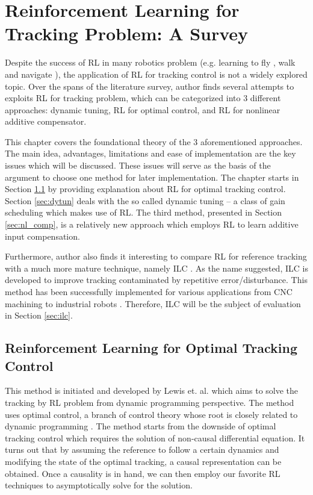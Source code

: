 %
\chapter{Reinforcement Learning for Tracking Problem: A Survey} \label{chap::survey}
Despite the success of \ac{RL} in many robotics problem (e.g. learning to fly \cite{Abbeel}, walk \cite{NIPS2007_3253} and navigate \cite{4543641}), the application of \ac{RL} for tracking control is not a widely explored topic. Over the spans of the literature survey, author finds several attempts to exploits \ac{RL} for tracking problem, which can be categorized into 3 different approaches: dynamic tuning, \ac{RL} for optimal control, and \ac{RL} for nonlinear additive compensator. 

This chapter covers the foundational theory of the 3 aforementioned approaches. The main idea, advantages, limitations and ease of implementation are the key issues which will be discussed. These issues will serve as the basis of the argument to choose one method for later implementation. The chapter starts in Section \ref{sec:rl_lqt} by providing explanation about \ac{RL} for optimal tracking control. Section \ref{sec:dytun} deals with the so called dynamic tuning -- a class of gain scheduling which makes use of \ac{RL}. The third method, presented in Section \ref{sec:nl_comp}, is a relatively new approach which employs \ac{RL} to learn additive input compensation.

Furthermore, author also finds it interesting to compare \ac{RL} for reference tracking with a much more mature technique, namely \ac{ILC} \cite{4048052}. As the name suggested, \ac {ILC} is developed to improve tracking contaminated by repetitive error/disturbance. This method has been successfully implemented for various applications from CNC machining \cite{299157} to industrial robots \cite{1044377}. Therefore, \ac {ILC} will be the subject of evaluation in Section \ref{sec:ilc}.


\section{Reinforcement Learning for Optimal Tracking Control} \label{sec:rl_lqt}
This method is initiated and developed by Lewis et. al. which aims to solve the tracking by \ac{RL} problem from dynamic programming perspective. The method uses optimal control, a branch of control theory whose root is closely related to dynamic programming \cite{126844}. The method starts from the downside of optimal tracking control which requires the solution of non-causal differential equation. It turns out that by assuming the reference to follow a certain dynamics and modifying the state of the optimal tracking, a causal representation can be obtained. Once a causality is in hand, we can then employ our favorite \ac{RL} techniques to asymptotically solve for the solution. 

